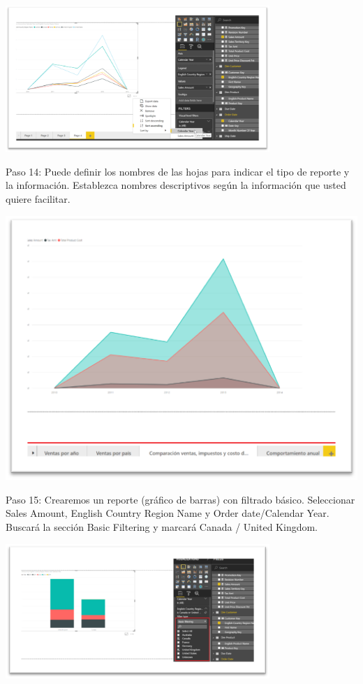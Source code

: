\documentclass[12pt,letterpaper]{article}
\begin{document}
\begin{center}
    \includegraphics[width=10cm]{img/15.png}  
\end{center}
Paso 14: Puede definir los nombres de las hojas para indicar el tipo de reporte y la información. Establezca nombres descriptivos según la información que usted quiere facilitar.
\begin{center}
    \includegraphics[width=16cm]{img/16.png}  
\end{center}
Paso 15: Crearemos un reporte (gráfico de barras) con filtrado básico. Seleccionar Sales Amount, English Country Region Name y Order date/Calendar Year. Buscará la sección Basic Filtering y marcará Canada / United Kingdom.
\begin{center}
    \includegraphics[width=10cm]{img/17.png}  
\end{center}
\end{document}
